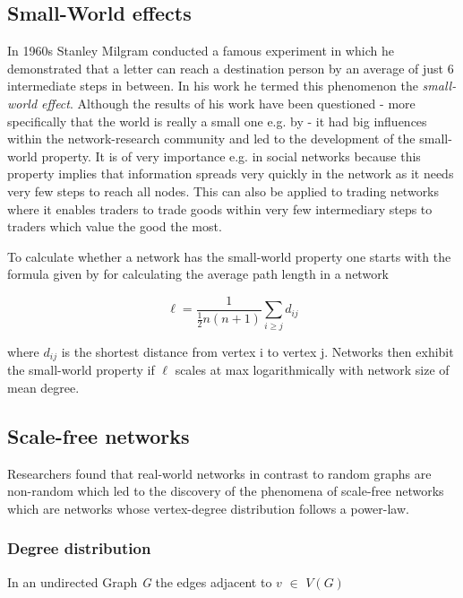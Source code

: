 \documentclass[../Bachelorarbeit.tex]{subfiles}
\begin{document}
\subsection{Small-World effects}
In 1960s Stanley Milgram conducted a famous experiment in which he demonstrated that a letter can reach a destination person by an average of just 6 intermediate steps in between. In his work \cite{TraverMilgram_StudySmallWorld} \cite{Milgram_SmallWorld} he termed this phenomenon the \textit{small-world effect}. Although the results of his work have been questioned - more specifically that the world is really a small one e.g. by \cite{Kleinfeld_BigWorld} - it had big influences within the network-research community and led to the development of the small-world property. It is of very importance e.g. in social networks because this property implies that information spreads very quickly in the network as it needs very few steps to reach all nodes. This can also be applied to trading networks where it enables traders to trade goods within very few intermediary steps to traders which value the good the most.

\medskip

To calculate whether a network has the small-world property one starts with the formula given by \cite{Newman_ComplexNetworks} for calculating the average path length in a network

\begin{equation}
\ell = \frac{1}{\frac{1}{2}n(n+1)} \displaystyle\sum_{i \geq j }^{} d_{ij}
\end{equation}

where $d_{ij}$ is the shortest distance from vertex i to vertex j. Networks then exhibit the small-world property if $\ell$ scales at max logarithmically with network size of mean degree.

\subsection{Scale-free networks}
Researchers found that real-world networks in contrast to random graphs are non-random which led to the discovery of the phenomena of scale-free networks which are networks whose vertex-degree distribution follows a power-law.

\subsubsection{Degree distribution}
In an undirected Graph \textit{G} the edges adjacent to $v$ $\in$ $V(G)$ 
\end{document}
